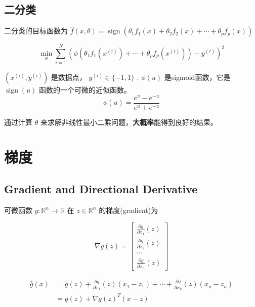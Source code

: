 \subsection{二分类}

二分类的目标函数为 $ \hat{f}(x, \theta)=\operatorname{sign}\left(\theta_{1} f_{1}(x)+\theta_{2} f_{2}(x)+\cdots+\theta_{p} f_{p}(x)\right) $ 


\begin{problem}[二分类问题]
    $$
\min _{\theta} \sum_{i=1}^{N}\left(\phi\left(\theta_{1} f_{1}\left(x^{(i)}\right)+\cdots+\theta_{p} f_{p}\left(x^{(i)}\right)\right)-y^{(i)}\right)^{2}
$$

$ \left(x^{(i)}, y^{(i)}\right) $ 是数据点， $ y^{(i)} \in\{-1,1\} $ . $ \phi(u) $ 是sigmoid函数，它是 $\operatorname{sign} (u) $ 函数的一个可微的近似函数。
$$
\phi(u)=\frac{e^{u}-e^{-u}}{e^{u}+e^{-u}}
$$
\end{problem}


通过计算 $ \theta $ 来求解非线性最小二乘问题，\textbf{大概率}能得到良好的结果。



\section{梯度}

\subsection{Gradient and Directional Derivative}

\begin{definition}
    可微函数 $ g: \mathbb{R}^{n} \rightarrow \mathbb{R} $ 在 $ z \in \mathbb{R}^{n} $ 的梯度(gradient)为

$$
\nabla g(z)=\left[\begin{array}{c}
\frac{\partial g}{\partial x_{1}}(z) \\
\frac{\partial g}{\partial x_{2}}(z) \\
\cdots \\
\frac{\partial g}{\partial x_{n}}(z)
\end{array}\right]
$$
\end{definition}

\begin{definition}
    $$ \begin{aligned} \hat{g}(x) &=g(z)+\frac{\partial g}{\partial x_{1}}(z)\left(x_{1}-z_{1}\right)+\cdots+\frac{\partial g}{\partial x_{n}}(z)\left(x_{n}-z_{n}\right) \\ &=g(z)+\nabla g(z)^{T}(x-z) \end{aligned} $$
\end{definition}

